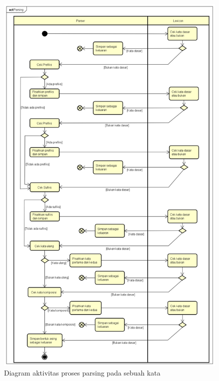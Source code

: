 \begin{figure}[H]
\centering
\includegraphics[scale=0.4]{Gambar/gambar-diagram-aktivitas-satu-kata}
\caption{Diagram aktivitas proses parsing pada sebuah kata} 
\label{gambar-diagram-aktivitas-satu-kata}
\end{figure}
